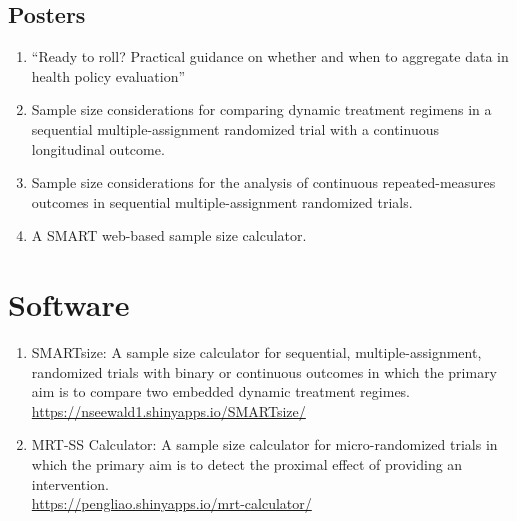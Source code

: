\documentclass[letterpaper,11pt]{article} %
\begin{document}
	\subsection*{Posters}
	\begin{enumerate}
		\item ``Ready to roll? Practical guidance on whether and when to aggregate data in health policy evaluation''
		\item Sample size considerations for comparing dynamic treatment regimens in  a sequential multiple-assignment randomized trial with a continuous longitudinal outcome.
		\item Sample size considerations for the analysis of continuous repeated-measures outcomes in sequential multiple-assignment randomized trials.
		\item A SMART web-based sample size calculator.
	\end{enumerate}
	
	\section*{Software}
	
	\begin{enumerate}
		\item SMARTsize: A sample size calculator for sequential, multiple-assignment, randomized trials with binary or continuous outcomes in which the primary aim is to compare two embedded dynamic treatment regimes. \\ \url{https://nseewald1.shinyapps.io/SMARTsize/}
		\item MRT-SS Calculator: A sample size calculator for micro-randomized trials in which the primary aim is to detect the proximal effect of providing an intervention.\\ \url{https://pengliao.shinyapps.io/mrt-calculator/}
	\end{enumerate}
	
\end{document}

